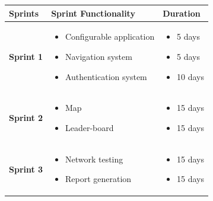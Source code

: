 \begin{table}[H]
    \renewcommand{\arraystretch}{1.5}
   
   \begin{tabular}{|p{}|p{}|p{}|}
   \hline
   \centering
   \textbf{Sprints } &  \textbf{Sprint Functionality} &\textbf{Duration}
\\ \hline
        \centering
       \textbf{Sprint 1}  &  
       \begin{itemize}[left=0pt,label={\textbf{-}}]
           \item Configurable application
           \item Navigation system
           \item Authentication system
       \end{itemize}
       & 
       \begin{itemize}[left=0pt,label={\textbf{-}}]
           \item  5 days
           \item  5 days
           \item  10 days
       \end{itemize}
       \\ \hline

       \centering
       \textbf{Sprint 2}  &  
       \begin{itemize}[left=0pt,label={\textbf{-}}]
           \item Map
           \item Leader-board 
       \end{itemize}
       &  \begin{itemize}[left=0pt,label={\textbf{-}}]
           \item  15 days
           \item  15 days
        
       \end{itemize} \\ \hline
       \centering
       \textbf{Sprint 3}  &  
       \begin{itemize}[left=0pt,label={\textbf{-}}]
           \item Network testing
           \item Report generation
       \end{itemize}
       &  \begin{itemize}[left=0pt,label={\textbf{-}}]
           \item  15 days
           \item  15 days
        

\end{itemize}
\end{tabular}
\end{table}
